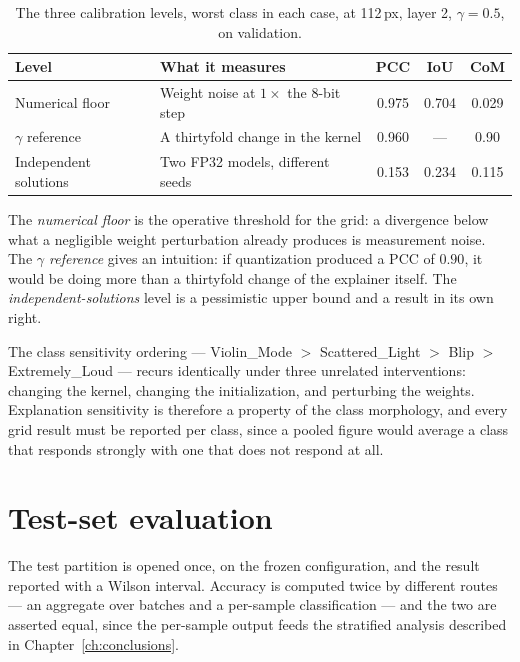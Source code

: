 \begin{table}[htbp]
\centering
\begin{tabular}{llccc}
\toprule
Level & What it measures & PCC & IoU & CoM \\
\midrule
Numerical floor & Weight noise at $1\times$ the 8-bit step & 0.975 & 0.704 & 0.029 \\
$\gamma$ reference & A thirtyfold change in the kernel & 0.960 & --- & 0.90 \\
Independent solutions & Two FP32 models, different seeds & 0.153 & 0.234 & 0.115 \\
\bottomrule
\end{tabular}
\caption{The three calibration levels, worst class in each case, at 112\,px,
layer 2, $\gamma = 0.5$, on validation.}
\label{tab:calibration}
\end{table}

The \emph{numerical floor} is the operative threshold for the grid: a divergence
below what a negligible weight perturbation already produces is measurement
noise. The \emph{$\gamma$ reference} gives an intuition: if quantization produced
a PCC of $0.90$, it would be doing more than a thirtyfold change of the explainer
itself. The \emph{independent-solutions} level is a pessimistic upper bound and a
result in its own right.

The class sensitivity ordering --- Violin\_Mode $>$ Scattered\_Light $>$ Blip $>$
Extremely\_Loud --- recurs identically under three unrelated interventions:
changing the kernel, changing the initialization, and perturbing the weights.
Explanation sensitivity is therefore a property of the class morphology, and
every grid result must be reported per class, since a pooled figure would average
a class that responds strongly with one that does not respond at all.

\section{Test-set evaluation}
\label{sec:test}

The test partition is opened once, on the frozen configuration, and the result
reported with a Wilson interval. Accuracy is computed twice by different routes
--- an aggregate over batches and a per-sample classification --- and the two are
asserted equal, since the per-sample output feeds the stratified analysis
described in Chapter~\ref{ch:conclusions}.
